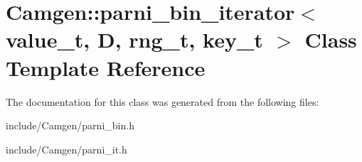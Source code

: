\hypertarget{a00392}{}\section{Camgen\+:\+:parni\+\_\+bin\+\_\+iterator$<$ value\+\_\+t, D, rng\+\_\+t, key\+\_\+t $>$ Class Template Reference}
\label{a00392}


The documentation for this class was generated from the following files\+:\begin{DoxyCompactItemize}
\item 
include/\+Camgen/parni\+\_\+bin.\+h\item 
include/\+Camgen/parni\+\_\+it.\+h\end{DoxyCompactItemize}
